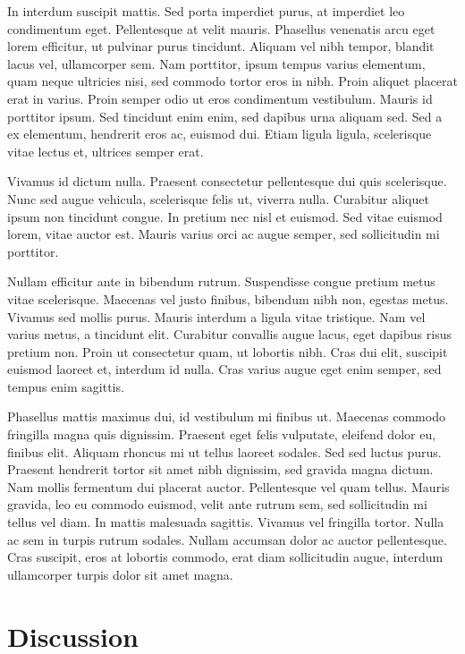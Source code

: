 \documentclass[conference]{IEEEtran}
\begin{document}
In interdum suscipit mattis. Sed porta imperdiet purus, at imperdiet leo condimentum eget. Pellentesque at velit mauris. Phasellus venenatis arcu eget lorem efficitur, ut pulvinar purus tincidunt. Aliquam vel nibh tempor, blandit lacus vel, ullamcorper sem. Nam porttitor, ipsum tempus varius elementum, quam neque ultricies nisi, sed commodo tortor eros in nibh. Proin aliquet placerat erat in varius. Proin semper odio ut eros condimentum vestibulum. Mauris id porttitor ipsum. Sed tincidunt enim enim, sed dapibus urna aliquam sed. Sed a ex elementum, hendrerit eros ac, euismod dui. Etiam ligula ligula, scelerisque vitae lectus et, ultrices semper erat.

Vivamus id dictum nulla. Praesent consectetur pellentesque dui quis scelerisque. Nunc sed augue vehicula, scelerisque felis ut, viverra nulla. Curabitur aliquet ipsum non tincidunt congue. In pretium nec nisl et euismod. Sed vitae euismod lorem, vitae auctor est. Mauris varius orci ac augue semper, sed sollicitudin mi porttitor.

Nullam efficitur ante in bibendum rutrum. Suspendisse congue pretium metus vitae scelerisque. Maecenas vel justo finibus, bibendum nibh non, egestas metus. Vivamus sed mollis purus. Mauris interdum a ligula vitae tristique. Nam vel varius metus, a tincidunt elit. Curabitur convallis augue lacus, eget dapibus risus pretium non. Proin ut consectetur quam, ut lobortis nibh. Cras dui elit, suscipit euismod laoreet et, interdum id nulla. Cras varius augue eget enim semper, sed tempus enim sagittis.

Phasellus mattis maximus dui, id vestibulum mi finibus ut. Maecenas commodo fringilla magna quis dignissim. Praesent eget felis vulputate, eleifend dolor eu, finibus elit. Aliquam rhoncus mi ut tellus laoreet sodales. Sed sed luctus purus. Praesent hendrerit tortor sit amet nibh dignissim, sed gravida magna dictum. Nam mollis fermentum dui placerat auctor. Pellentesque vel quam tellus. Mauris gravida, leo eu commodo euismod, velit ante rutrum sem, sed sollicitudin mi tellus vel diam. In mattis malesuada sagittis. Vivamus vel fringilla tortor. Nulla ac sem in turpis rutrum sodales. Nullam accumsan dolor ac auctor pellentesque. Cras suscipit, eros at lobortis commodo, erat diam sollicitudin augue, interdum ullamcorper turpis dolor sit amet magna. 

\section{Discussion}
\end{document}

